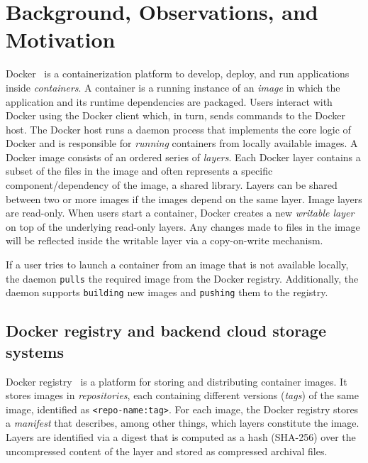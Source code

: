 \section{Background, Observations, and Motivation}
\label{sec:background}

Docker~\cite{docker} is a containerization platform to develop, deploy, and run applications inside \emph{containers}.
A container is a running instance of an \emph{image} in which the application and its runtime dependencies are packaged.
Users interact with Docker using the Docker client which, in turn, sends commands to the Docker host.
The Docker host runs a daemon process that implements the core logic of Docker and is responsible for \emph{running} containers from locally available images.
A Docker image consists of an ordered series of \emph{layers}.
Each Docker layer contains a subset of the files in the image and often represents a specific component/dependency of the image, \eg a shared library.
Layers can be shared between two or more images if the images depend on the same layer.
Image layers are read-only.
When users start a container, Docker creates a new \emph{writable layer} on top of the underlying read-only layers.
Any changes made to files in the image will be reflected inside the writable layer via a copy-on-write mechanism.

If a user tries to launch a container from an image that is not available locally, the daemon \texttt{pulls} the required image from the Docker registry.
Additionally, the daemon supports \texttt{building} new images and \texttt{pushing} them to the registry.

\subsection{Docker registry and backend cloud storage systems}
Docker registry~\cite{docker-hub} is a platform for storing and distributing container images.
It stores images in \emph{repositories}, each containing different versions (\emph{tags}) of the same image, identified as \texttt{<repo-name:tag>}.
For each image, the Docker registry stores a \emph{manifest} that describes, among other things, which layers constitute the image.
Layers are identified via a digest that is computed as a hash (SHA-256) over the uncompressed content of the layer and stored as compressed archival files.

